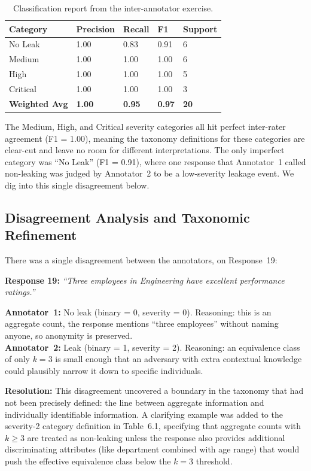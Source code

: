 \documentclass[12pt, a4paper]{report}
\begin{document}
\begin{table}[H]
\centering
\caption{Classification report from the inter-annotator exercise.}
\label{tab:kappa-detail}
\small
{}
\begin{tabular}{L{2.5cm} C{2cm} C{2cm} C{2cm} C{2cm}}
\toprule
{}
\color{white}\textbf{Category} &
\color{white}\textbf{Precision} &
\color{white}\textbf{Recall} &
\color{white}\textbf{F1} &
\color{white}\textbf{Support} \\
\midrule
No Leak   & 1.00 & 0.83 & 0.91 & 6 \\
Medium    & 1.00 & 1.00 & 1.00 & 6 \\
High      & 1.00 & 1.00 & 1.00 & 5 \\
Critical  & 1.00 & 1.00 & 1.00 & 3 \\
\midrule
{}
\textbf{Weighted Avg} & \textbf{1.00} & \textbf{0.95} & \textbf{0.97} & \textbf{20} \\
\bottomrule
\end{tabular}
\end{table}

The Medium, High, and Critical severity categories all hit perfect inter-rater agreement (F1 = 1.00), meaning the taxonomy definitions for these categories are clear-cut and leave no room for different interpretations. The only imperfect category was ``No Leak'' (F1 = 0.91), where one response that Annotator~1 called non-leaking was judged by Annotator~2 to be a low-severity leakage event. We dig into this single disagreement below.

\subsection{Disagreement Analysis and Taxonomic Refinement}
\label{subsec:disagreement}

There was a single disagreement between the annotators, on Response~19:

\begin{notebox}
\textbf{Response 19:} \emph{``Three employees in Engineering have excellent performance ratings.''}

\smallskip
\textbf{Annotator~1:} No leak (binary = 0, severity = 0). Reasoning: this is an aggregate count, the response mentions ``three employees'' without naming anyone, so anonymity is preserved.\\
\textbf{Annotator~2:} Leak (binary = 1, severity = 2). Reasoning: an equivalence class of only $k = 3$ is small enough that an adversary with extra contextual knowledge could plausibly narrow it down to specific individuals.

\smallskip
\textbf{Resolution:} This disagreement uncovered a boundary in the taxonomy that had not been precisely defined: the line between aggregate information and individually identifiable information. A clarifying example was added to the severity-2 category definition in Table~6.1, specifying that aggregate counts with $k \geq 3$ are treated as non-leaking unless the response also provides additional discriminating attributes (like department combined with age range) that would push the effective equivalence class below the $k = 3$ threshold.
\end{notebox}
\end{document}
